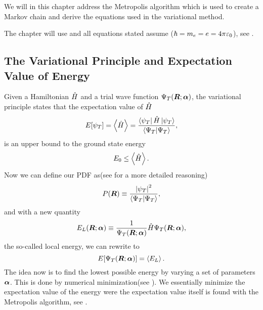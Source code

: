     We will in this chapter address the Metropolis algorithm which is used to
    create a Markov chain and derive the equations used in the variational
    method.

    The chapter will use  \cite{GriffQuan} and all
    equations stated assume \cite{atomicunits}
    ($\hbar=m_e=e=4\pi\varepsilon_0$), see .

    \subsection{The Variational Principle and Expectation Value of Energy}
        Given a Hamiltonian $\hat{H}$ and a trial wave function ${\Psi}_T(\boldsymbol{{R}};\boldsymbol{{\alpha}})$, the
        variational principle \cite{GriffQuan, NeOr} states that the
        expectation value of $\hat{H}$
            \begin{equation}
                E[\psi_T] = \left< {\hat{H}} \right> =
                \frac{\bra{\psi_T}\hat{H}\ket{\psi_T}}{\bra{\Psi_T}\ket{\Psi_T}},
                \label{eq:ecpE}
            \end{equation}
        is an upper bound to the ground state energy
            \begin{equation}
                E_0 \leq \left< {\hat{H}} \right>.
                \label{eq:ecpEBound}
            \end{equation}
        Now we can define our PDF as(see  for a more
        detailed reasoning)
            \begin{equation}
                P(\boldsymbol{{R}}) \equiv \frac{\abs{\psi_T}^2}{\bra{\Psi_T}\ket{\Psi_T}},
                \label{eq:PDFdef}
            \end{equation}
        and with a new quantity
            \begin{equation}
                E_L(\boldsymbol{{R}};\boldsymbol{{\alpha}}) \equiv \frac{1}{{\Psi}_T(\boldsymbol{{R}};\boldsymbol{{\alpha}})}\hat{H}{\Psi}_T(\boldsymbol{{R}};\boldsymbol{{\alpha}}),
                \label{eq:ELdef}
            \end{equation}
        the so-called local energy, we can rewrite  to
            \begin{equation}
                E[{\Psi}_T(\boldsymbol{{R}};\boldsymbol{{\alpha}})] = \left< {E_L} \right>.
            \end{equation}
        The idea now is to find the lowest possible energy by varying a set of
        parameters $\boldsymbol{{\alpha}}$. This is done by numerical
        minimization(see ). We essentially minimize the
        expectation value of the energy were the expectation value itself is
        found with the Metropolis algorithm, see .

